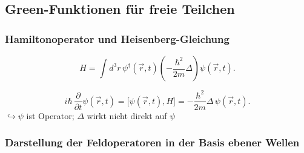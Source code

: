 \subsection{Green-Funktionen für freie Teilchen}

\subsubsection*{Hamiltonoperator und Heisenberg-Gleichung}


\begin{equation}
  H = \int d^3r\,\psi^{\dagger}(\vec r,t)\left(-\frac{\hbar^2}{2m}\Delta\right)\psi(\vec r,t).
\end{equation}

\begin{equation}
  i\hbar\,\frac{\partial}{\partial t}\psi(\vec r,t)
  = \bigl[\psi(\vec r,t),H\bigr]
  = -\frac{\hbar^2}{2m}\Delta\,\psi(\vec r,t).
\end{equation}
\qquad $\hookrightarrow \psi$ ist Operator; $\Delta$ wirkt nicht direkt auf $\psi$

\subsubsection*{Darstellung der Feldoperatoren in der Basis ebener Wellen}

